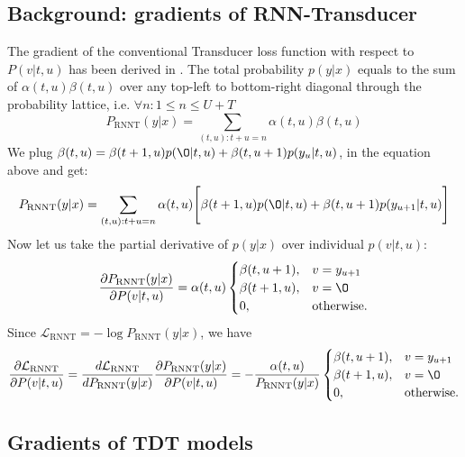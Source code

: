 \documentclass{article}
\begin{document}
\subsection{Background: gradients of RNN-Transducer}
The gradient of the conventional Transducer loss 
function with respect to $P(v|t, u)$ has been derived in \cite{graves2012sequence}.  The total probability $p(y | x)$ equals to the sum of $\alpha(t, u) \beta(t, u)$ over any top-left to bottom-right diagonal through the probability lattice, i.e. $\forall n: 1 \leq n \leq U + T$
\begin{equation} 
\label{diagonal}
    P_\text{RNNT}(y|x) = \sum_{(t,u): t + u =n} \alpha(t, u) \beta(t, u)
\end{equation}
We plug $\beta(t, u) = \beta(t + 1, u) p(\O | t, u) + \beta(t, u + 1) p(y_u | t, u)$, in the equation above and get: 
\begin{equation}
    P_\text{RNNT}(y|x) = \sum_{(t,u): t + u =n} \alpha(t, u) \Biggl[  \beta(t + 1, u) p(\O | t, u) + \beta(t, u + 1) p(y_{u+1} | t, u) \Biggr]
\end{equation}
Now let us take the partial derivative of $p(y|x)$ over individual $p(v | t, u)$: 
\begin{equation}
    \frac{\partial P_\text{RNNT}(y | x)}{\partial P(v | t, u)} =  \alpha(t, u) \begin{cases}
        \beta(t,u+1),  & v = y_{u+1} \\
        \beta(t+1,u),  & v = \O \\
        0,             & \text{otherwise.} \\
    \end{cases}
\end{equation}
Since $\mathcal{L}_\text{RNNT} =  -\log P_\text{RNNT}(y | x)$, we have
\begin{equation}
\label{rnnt_grad}
    \frac{\partial \mathcal{L}_\text{RNNT}}{\partial P(v|t, u)} = \frac{d \mathcal{L}_\text{RNNT}}{d P_\text{RNNT}(y | x)} \frac{\partial {P_\text{RNNT}(y | x)}}{{\partial P(v|t, u)}} =   -\frac{\alpha(t,u)}{P_\text{RNNT}(y|x)}\begin{cases}
        \beta(t,u+1),  & v = y_{u+1} \\
        \beta(t+1,u),  & v = \O \\
        0,             & \text{otherwise.} \\
    \end{cases}
\end{equation}

\subsection{Gradients of TDT models}
\end{document}
